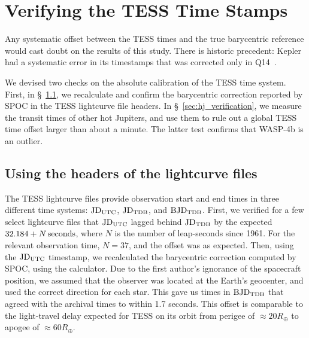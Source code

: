\documentclass[12pt,twocolumn,tighten]{aastex62}
\begin{document}
                            
 


\appendix

\section{Verifying the TESS Time Stamps}
\label{sec:verify_tess}

Any systematic offset between the TESS times and the true barycentric
reference would cast doubt on the results of this study.  There is
historic precedent: Kepler had a systematic error in its timestamps
that was corrected only in Q14~\citep[][Section
3.4]{kepler_DR19_2013}.

We devised two checks on the absolute calibration of the TESS time
system.  First, in \S~\ref{sec:headers}, we recalculate and confirm
the barycentric correction reported by SPOC in the TESS lightcurve
file headers.  In \S~\ref{sec:hj_verification}, we measure the transit
times of other hot Jupiters, and use them to rule out a global TESS
time offset larger than about a minute.  The latter test confirms that
WASP-4b is an outlier.

\subsection{Using the headers of the lightcurve files}
\label{sec:headers}

The TESS lightcurve files provide observation start and end times in
three different time systems: ${\rm JD}_{\rm UTC}$, ${\rm JD}_{\rm
TDB}$, and ${\rm BJD}_{\rm TDB}$.  First, we verified for a few select
lightcurve files that ${\rm JD}_{\rm UTC}$ lagged behind ${\rm
JD}_{\rm TDB}$ by the expected $32.184 + N\,{\rm seconds}$, where $N$
is the number of leap-seconds since 1961. For the relevant observation
time, $N=37$, and the offset was as expected.  Then, using the ${\rm
JD}_{\rm UTC}$ timestamp, we recalculated the barycentric correction
computed by SPOC, using the \citealt{eastman_achieving_2010}
calculator.  Due to the first author's ignorance of the spacecraft
position, we assumed that the observer was located at the Earth's
geocenter, and used the correct direction for each star.  This gave us
times in ${\rm BJD}_{\rm TDB}$ that agreed with the archival times to
within 1.7 seconds.  This offset is comparable to the light-travel
delay expected for TESS on its orbit from perigee of $\approx
20R_\oplus$ to apogee of $\approx 60R_\oplus$.
\end{document}
